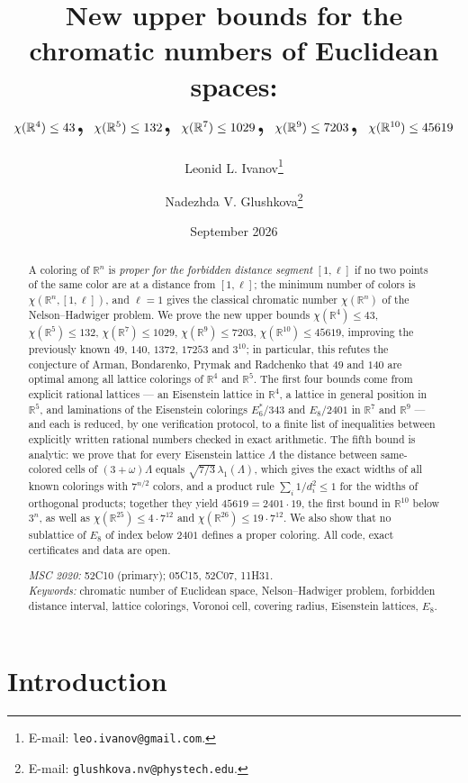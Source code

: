 \documentclass[10pt]{article}
\title{\bfseries New upper bounds for the chromatic numbers of Euclidean
spaces:\\[3pt]
\large $\chi(\R^4)\le43$,\; $\chi(\R^5)\le132$,\; $\chi(\R^7)\le1029$,\;
$\chi(\R^9)\le7203$,\; $\chi(\R^{10})\le45619$}
\author{Leonid L. Ivanov\thanks{E-mail: \texttt{leo.ivanov@gmail.com}.}
  \and Nadezhda V. Glushkova\thanks{E-mail:
  \texttt{glushkova.nv@phystech.edu}.}}
\date{September 2026}
\theoremstyle{plain}
\theoremstyle{remark}
\newcommand{\R}{\mathbb{R}}
\begin{document}
\maketitle

\begin{abstract}
\noindent
A coloring of $\R^n$ is \emph{proper for the forbidden distance segment}
$[1,\ell]$ if no two points of the same color are at a distance from
$[1,\ell]$; the minimum number of colors is $\chi(\R^n,[1,\ell])$, and
$\ell=1$ gives the classical chromatic number $\chi(\R^n)$ of the
Nelson--Hadwiger problem. We prove the new upper bounds
$\chi(\R^4)\le43$, $\chi(\R^5)\le132$, $\chi(\R^7)\le1029$,
$\chi(\R^9)\le7203$, $\chi(\R^{10})\le45619$, improving the previously
known $49$, $140$, $1372$, $17253$ and $3^{10}$; in particular, this refutes
the conjecture of Arman, Bondarenko, Prymak and Radchenko that $49$ and
$140$ are optimal among all lattice colorings of $\R^4$ and $\R^5$. The
first four bounds come from explicit rational lattices --- an Eisenstein
lattice in $\R^4$, a lattice in general position in $\R^5$, and laminations
of the Eisenstein colorings $E_6^*/343$ and $E_8/2401$ in $\R^7$ and $\R^9$
--- and each is reduced, by one verification protocol, to a finite list of
inequalities between explicitly written rational numbers checked in exact
arithmetic. The fifth bound is analytic: we prove that for every Eisenstein
lattice $\Lambda$ the distance between same-colored cells of
$(3+\omega)\Lambda$ equals $\sqrt{7/3}\,\lambda_1(\Lambda)$, which gives the
exact widths of all known colorings with $7^{n/2}$ colors, and a product
rule $\sum_i1/d_i^2\le1$ for the widths of orthogonal products; together they
yield $45619=2401\cdot19$, the first bound in $\R^{10}$ below $3^n$, as well
as $\chi(\R^{25})\le4\cdot7^{12}$ and $\chi(\R^{26})\le19\cdot7^{12}$. We
also show that no sublattice of $E_8$ of index below $2401$ defines a proper
coloring. All code, exact certificates and data are open.

\smallskip
\noindent\emph{MSC 2020:} 52C10 (primary); 05C15, 52C07, 11H31.\\
\emph{Keywords:} chromatic number of Euclidean space, Nelson--Hadwiger
problem, forbidden distance interval, lattice colorings, Voronoi cell,
covering radius, Eisenstein lattices, $E_8$.
\end{abstract}

\section{Introduction}\label{sec:intro}
\end{document}
